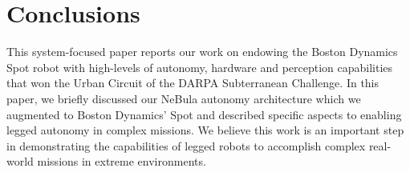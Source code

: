 \documentclass[letterpaper, 10pt, conference]{ieeeconf}      %
\newcommand{\rev}[1]{{\color{blue} #1 }} %
\begin{document}





\section{Conclusions}\label{sec:conclusions}

\rev{This system-focused paper reports our work on endowing the Boston Dynamics Spot robot with high-levels of autonomy, hardware and perception capabilities that won the Urban Circuit of the DARPA Subterranean Challenge.}
In this paper, \rev{we briefly discussed our NeBula autonomy architecture which we augmented to Boston Dynamics' Spot and described specific aspects to enabling legged autonomy in complex missions.}  
We believe this work is an important step in demonstrating the capabilities of legged robots to accomplish complex real-world missions in extreme environments.
\end{document}
